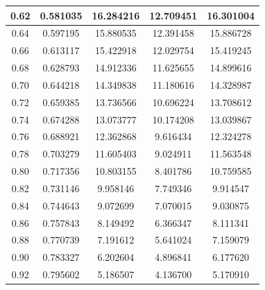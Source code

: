 \documentclass[aps,amsmath,amssymb,floatfix]{revtex4}
\begin{document}
\begin{enumerate}
\begin{enumerate}
\begin{table}[H]
\begin{tabular}{|c|c|c|c|c|}
	      	      		0.62         & 0.581035            & 16.284216           & 12.709451           & 16.301004           \\ \hline
	      	      		0.64         & 0.597195            & 15.880535           & 12.391458           & 15.886728           \\ \hline
	      	      		0.66         & 0.613117            & 15.422918           & 12.029754           & 15.419245           \\ \hline
	      	      		0.68         & 0.628793            & 14.912336           & 11.625655           & 14.899616           \\ \hline
	      	      		0.70         & 0.644218            & 14.349838           & 11.180616           & 14.328987           \\ \hline
	      	      		0.72         & 0.659385            & 13.736566           & 10.696224           & 13.708612           \\ \hline
	      	      		0.74         & 0.674288            & 13.073777           & 10.174208           & 13.039867           \\ \hline
	      	      		0.76         & 0.688921            & 12.362868           & 9.616434            & 12.324278           \\ \hline
	      	      		0.78         & 0.703279            & 11.605403           & 9.024911            & 11.563548           \\ \hline
	      	      		0.80         & 0.717356            & 10.803155           & 8.401786            & 10.759585           \\ \hline
	      	      		0.82         & 0.731146            & 9.958146            & 7.749346            & 9.914547            \\ \hline
	      	      		0.84         & 0.744643            & 9.072699            & 7.070015            & 9.030875            \\ \hline
	      	      		0.86         & 0.757843            & 8.149492            & 6.366347            & 8.111341            \\ \hline
	      	      		0.88         & 0.770739            & 7.191612            & 5.641024            & 7.159079            \\ \hline
	      	      		0.90         & 0.783327            & 6.202604            & 4.896841            & 6.177620            \\ \hline
	      	      		0.92         & 0.795602            & 5.186507            & 4.136700            & 5.170910            \\ \hline

\end{tabular}
\end{table}
\end{enumerate}
\end{enumerate}
\end{document}
